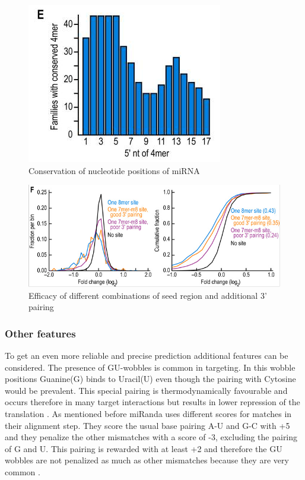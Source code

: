 \documentclass[12pt]{article}
\begin{document}
\begin{figure}[h]
\centering
\includegraphics[scale=0.5]{results/sites_conserved.PNG} 
\caption{Conservation of nucleotide positions of miRNA}
\label{conserved}
\end{figure}

\begin{figure}[h]
\centering
\includegraphics[scale=0.5]{results/site_efficacy.PNG} 
\caption{Efficacy of different combinations of seed region and additional 3' pairing}
\label{efficacy}
\end{figure}



\vspace{1cm}


\subsubsection{Other features}
To get an even more reliable and precise prediction additional features can be considered. The presence of GU-wobbles is common in targeting. In this wobble positions Guanine(G) binds to Uracil(U) even though the pairing with Cytosine would be prevalent. This special pairing is thermodynamically favourable and occurs therefore in many target interactions but results in lower repression of the translation \cite{Doench}. As mentioned before miRanda uses different scores for matches in their alignment step. They score the usual base pairing A-U and G-C with +5 and they penalize the other mismatches with a score of -3, excluding the pairing of G and U. This pairing is rewarded with at least +2 and therefore the GU wobbles are not penalized as much as other mismatches because they are very common \cite{Enright}.\\\\
 
\end{document}
